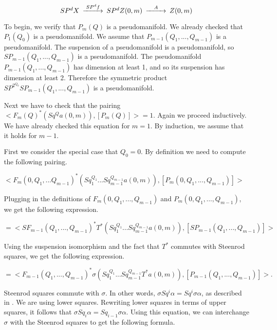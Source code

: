 \documentclass{amsart}
\newtheorem*{Theorem 1}{Theorem 1}
\newtheorem*{Theorem 2}{Theorem 2}
\newtheorem*{Theorem 1A}{Theorem 1A}
\newtheorem*{Theorem 2A}{Theorem 2A}
\newtheorem*{vanishing lemma}{Vanishing Lemma}
\numberwithin{equation}{section}
\begin{document}
\[
\begin{CD}
SP^d X @>SP^d f>> SP^d Z(0,m) @>A>> Z(0,m)
\end{CD}
\]

To begin, we verify that $P_m(Q)$ is a pseudomanifold.
We already checked that $P_1(Q_0)$ is a pseudomanifold.
We assume that $P_{m-1}(Q_1, ..., Q_{m-1})$ is a pseudomanifold.  The suspension of a pseudomanifold 
is a pseudomanifold, so $S P_{m-1}(Q_1,
..., Q_{m-1})$ is a pseudomanifold.  The pseudomanifold $P_{m-1}(Q_1, ..., Q_{m-1})$ has dimension at least
1, and so its suspension has dimension at least 2.  Therefore the symmetric product
$SP^{2^{Q_0}} S P_{m-1} (Q_1, ..., Q_{m-1})$ is a pseudomanifold.

Next we have to check that the pairing $<F_m(Q)^* (Sq^Q a(0,m)), [P_m(Q)]> = 1$.  Again
we proceed inductively.  We have already checked this equation for $m=1$.  By induction,
we assume that it holds for $m-1$.

First we consider the special case that $Q_0 = 0$.  By definition we need to compute
the following pairing.

\vskip3pt

$<F_{m}(0, Q_1, ... Q_{m-1})^* (Sq_1^{Q_1} ... Sq_{m-1}^{Q_{m-1}} a(0,m)), [P_m(0, Q_1, ..., Q_{m-1})] >$

\vskip3pt

Plugging in the definitions of $F_m(0, Q_1, ..., Q_{m-1})$ and $P_m(0, Q_1, ..., Q_{m-1})$, we get
the following expression.

\vskip3pt

$=<SF_{m-1}(Q_1, ..., Q_{m-1})^* T^*(Sq_1 ^{Q_1} ... Sq_{m-1}^{Q_{m-1}} a(0,m)), [S P_{m-1}(Q_1, ..., Q_{m-1})] >$

\vskip3pt

Using the suspension isomorphism and the fact that $T^*$ commutes with Steenrod squares, 
we get the following expression.

\vskip3pt

$=<F_{m-1}(Q_1, ..., Q_{m-1})^* \sigma (Sq_1^{Q_1} ... Sq_{m-1}^{Q_{m-1}} T^* a(0,m)), [P_{m-1}(Q_1, ..., Q_{m-1})]>.$

\vskip3pt

Steenrod squares commute with $\sigma$.  In other words, $\sigma Sq^i \alpha = Sq^i \sigma \alpha$, as described
in \cite{H}.  We are using lower squares.  Rewriting lower squares in terms of upper squares, it follows
that $\sigma Sq_i \alpha = Sq_{i-1} \sigma \alpha$.  Using this equation, we can interchange $\sigma$ with
the Steenrod squares to get the following formula.
\end{document}
